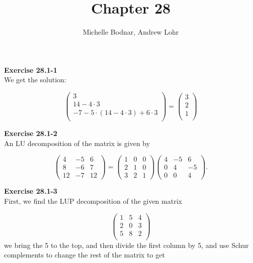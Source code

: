 \documentclass{article}
\title{Chapter 28}
\author{Michelle Bodnar, Andrew Lohr}
\begin{document}
\maketitle
\noindent\textbf{Exercise 28.1-1}\\

We get the solution:

\[
\left(
\begin{array}{c}
3\\
14 - 4\cdot3\\
-7 -5 \cdot( 14 - 4 \cdot 3) + 6\cdot 3\\
\end{array}\right) = \left(
\begin{array}{c}
3\\
2\\
1 \\
\end{array}\right)
\]

\noindent\textbf{Exercise 28.1-2}\\

An LU decomposition of the matrix is given by 

\[ \left(\begin{array}{ccc} 4 & -5 & 6 \\ 8 & -6 & 7 \\ 12 & -7 & 12 \end{array} \right) =  \left(\begin{array}{ccc} 1 & 0 & 0 \\ 2 & 1 & 0 \\ 3 & 2 & 1 \end{array} \right) \left(\begin{array}{ccc} 4 & -5 & 6 \\ 0 & 4 & -5 \\ 0 & 0 & 4 \end{array} \right).\]

\noindent\textbf{Exercise 28.1-3}\\

First, we find the LUP decomposition of the given matrix

\[
\left(\begin{array}{ccc}
1&5&4\\
2&0&3\\
5&8&2\\
\end{array} \right)
\]
 we bring the 5 to the top, and then divide the first column by 5, and use Schur complements to change the rest of the matrix to get
 
\end{document}
